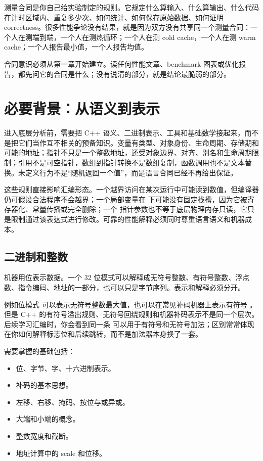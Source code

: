 测量合同是你自己给实验制定的规则。它规定什么算输入、什么算输出、什么代码在计时区域内、重复多少次、如何统计、如何保存原始数据、如何证明 correctness。很多性能争论没有结果，就是因为双方没有共享同一个测量合同：一个人在测端到端，一个人在测热循环；一个人在测 cold cache，一个人在测 warm cache；一个人报告最小值，一个人报告均值。

合同意识必须从第一章开始建立。读任何性能文章、benchmark 图表或优化报告，都先问它的合同是什么；没有说清的部分，就是结论最脆弱的部分。

\section{必要背景：从语义到表示}

进入底层分析前，需要把 C++ 语义、二进制表示、工具和基础数学接起来，而不是把它们当作互不相关的预备知识。变量有类型、对象身份、生命周期、存储期和可能的地址；指针不只是一个整数地址，还受对象边界、对齐、别名和生命周期限制；引用不是可空指针，数组到指针转换不是数组复制，函数调用也不是文本替换。未定义行为不是“随机返回一个值”，而是语言合同已经不再给出保证。

这些规则直接影响汇编形态。一个越界访问在某次运行中可能读到数值，但编译器仍可假设合法程序不会越界；一个局部变量在  下可能没有固定栈槽，因为它被寄存器化、常量传播或完全删除；一个  指针参数也不等于底层物理内存只读，它只是限制通过该表达式进行修改。可靠的性能解释必须同时尊重语言语义和机器成本。

\subsection{二进制和整数}

机器用位表示数据。一个 32 位模式可以解释成无符号整数、有符号整数、浮点数、指令编码、地址的一部分，也可以只是字节序列。表示和解释必须分开。

例如位模式  可以表示无符号整数最大值，也可以在常见补码机器上表示有符号 。但是 C++ 的有符号溢出规则、无符号回绕规则和机器补码表示不是同一个层次。后续学习汇编时，你会看到同一条  可以用于有符号和无符号加法；区别常常体现在你如何解释标志位和后续跳转，而不是加法器本身换了一套。

需要掌握的基础包括：

\begin{itemize}
  \item 位、字节、字、十六进制表示。
  \item 补码的基本思想。
  \item 左移、右移、掩码、按位与或异或。
  \item 大端和小端的概念。
  \item 整数宽度和截断。
  \item 地址计算中的 scale 和位移。
\end{itemize}

